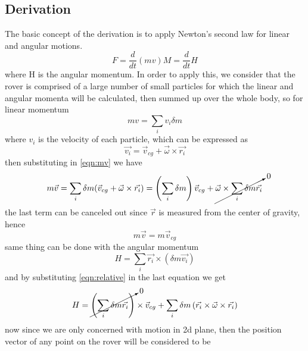 \documentclass{article}
\begin{document}
	\subsection{Derivation}
	The basic concept of the derivation is to apply Newton's second law for linear and angular motions.
	\begin{subequations}
	\begin{equation}
	F = \frac{d}{dt}\left(mv\right)
	\end{equation} 
	\begin{equation}
	M = \frac{d}{dt} H
	\end{equation}
	\label{eqn:newton_second}
	\end{subequations}
	where H is the angular momentum. In order to apply this, we consider that the rover is comprised of a large number of small particles for which the linear and angular momenta will be calculated, then summed up over the whole body, so for linear momentum
	\begin{equation}
	mv = \sum_{i} v_i\delta m 
	\label{eqn:mv}
	\end{equation}
	where $v_i$ is the velocity of each particle, which can be expressed as
	\begin{equation}
	\vec{v_i} = \vec{v}_{cg} + \vec{\omega} \times \vec{r_i} 
	\label{eqn:relative}
	\end{equation}
	then substituting in \ref{eqn:mv} we have
	\begin{equation}
	m\vec{v} = \sum_{i}\delta m(\vec{v}_{cg} + \vec{\omega}\times\vec{r_i}) = \left(\sum_{i}\delta m\right)\vec{v}_{cg} + \cancelto{0}{\vec{\omega}\times \sum_{i} \delta m \vec{r_i}}
	\end{equation}
	the last term can be canceled out since $\vec{r}$ is measured from the center of gravity, hence
	\begin{equation}
	m\vec{v} = m\vec{v}_{cg}
	\end{equation}
	same thing can be done with the angular momentum
	\begin{equation}
	H = \sum_{i}\vec{r_i}\times \left(\delta m\vec{v_i}\right)
	\end{equation}
	and by substituting \ref{eqn:relative} in the last equation we get
	\begin{equation}
	H = \cancelto{0}{\left(\sum_{i}\delta m\vec{r_i}\right)}\times\vec{v}_{cg} + \sum_{i}\delta m\left(\vec{r_i}\times \vec{\omega}\times\vec{r_i}\right)
 	\label{eqn:H}
	\end{equation}
	now since we are only concerned with motion in 2d plane, then the position vector of any point on the rover will be considered to be 
\end{document}
